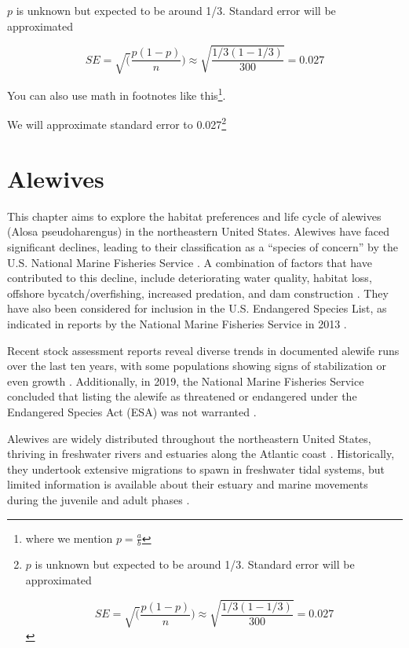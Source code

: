\documentclass[
]{book}
\begin{document}
\(p\) is unknown but expected to be around 1/3. Standard error will be approximated

\[
SE = \sqrt(\frac{p(1-p)}{n}) \approx \sqrt{\frac{1/3 (1 - 1/3)} {300}} = 0.027
\]

You can also use math in footnotes like this\footnote{where we mention \(p = \frac{a}{b}\)}.

We will approximate standard error to 0.027\footnote{\(p\) is unknown but expected to be around 1/3. Standard error will be approximated

  \[
  SE = \sqrt(\frac{p(1-p)}{n}) \approx \sqrt{\frac{1/3 (1 - 1/3)} {300}} = 0.027
  \]}

\hypertarget{alewives}{%
\chapter{Alewives}\label{alewives}}

This chapter aims to explore the habitat preferences and life cycle of alewives (Alosa pseudoharengus) in the northeastern United States. Alewives have faced significant declines, leading to their classification as a ``species of concern'' by the U.S. National Marine Fisheries Service \citep{nmfs_national_marine_fisheries_service_species_2009}. A combination of factors that have contributed to this decline, include deteriorating water quality, habitat loss, offshore bycatch/overfishing, increased predation, and dam construction \citep{kocovsky_linking_2008, nmfs_national_marine_fisheries_service_species_2009, bethoney_environmental_2014}. They have also been considered for inclusion in the U.S. Endangered Species List, as indicated in reports by the National Marine Fisheries Service in 2013 \citep{nmfs_national_marine_fisheries_service_endangered_2013}.

Recent stock assessment reports reveal diverse trends in documented alewife runs over the last ten years, with some populations showing signs of stabilization or even growth \citep{asmfc_river_2017}. Additionally, in 2019, the National Marine Fisheries Service concluded that listing the alewife as threatened or endangered under the Endangered Species Act (ESA) was not warranted \citep{nmfs_national_marine_fisheries_service_not_2019}.

Alewives are widely distributed throughout the northeastern United States, thriving in freshwater rivers and estuaries along the Atlantic coast \citep{asmfc_fishery_1985}. Historically, they undertook extensive migrations to spawn in freshwater tidal systems, but limited information is available about their estuary and marine movements during the juvenile and adult phases \citep{mccartin_new_2019}.
\end{document}
